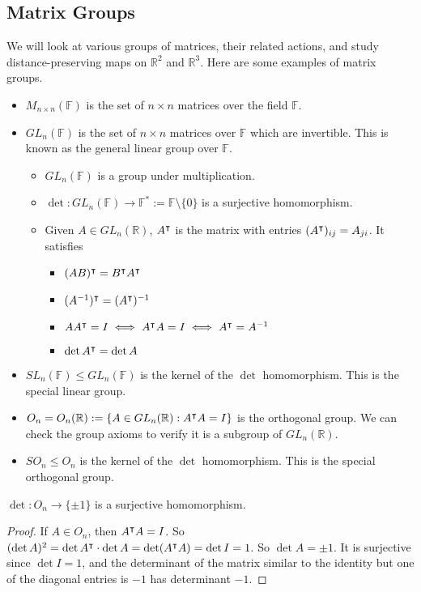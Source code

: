 \subsection{Matrix Groups}
We will look at various groups of matrices, their related actions, and study distance-preserving maps on \(\mathbb R^2\) and \(\mathbb R^3\).
Here are some examples of matrix groups.
\begin{itemize}
	\item \(M_{n \times n}(\mathbb F)\) is the set of \(n \times n\) matrices over the field \(\mathbb F\).
	\item \(GL_n(\mathbb F)\) is the set of \(n \times n\) matrices over \(\mathbb F\) which are invertible.
	      This is known as the general linear group over \(\mathbb F\).
	      \begin{itemize}
		      \item \(GL_n(\mathbb F)\) is a group under multiplication.
		      \item \(\det\colon GL_n(\mathbb F) \to \mathbb F^* := \mathbb F \setminus \{ 0 \}\) is a surjective homomorphism.
		      \item Given \(A \in GL_n(\mathbb R)\), \(A^\intercal\) is the matrix with entries \((A^\intercal)_{ij} = A_{ji}\).
		            It satisfies
		            \begin{itemize}
			            \item \((AB)^\intercal = B^\intercal A^\intercal\)
			            \item \((A^{-1})^\intercal = (A^\intercal)^{-1}\)
			            \item \(AA^\intercal = I \iff A^\intercal A = I \iff A^\intercal = A^{-1}\)
			            \item \(\det A^\intercal = \det A\)
		            \end{itemize}
	      \end{itemize}
	\item \(SL_n(\mathbb F) \leq GL_n(\mathbb F)\) is the kernel of the \(\det\) homomorphism.
	      This is the special linear group.
	\item \(O_n = O_n(\mathbb R) := \{ A \in GL_n(\mathbb R): A^\intercal A = I \}\) is the orthogonal group.
	      We can check the group axioms to verify it is a subgroup of \(GL_n(\mathbb R)\).
	\item \(SO_n \leq O_n\) is the kernel of the \(\det\) homomorphism.
	      This is the special orthogonal group.
\end{itemize}
\begin{proposition}
	\(\det \colon O_n \to \{ \pm 1 \}\) is a surjective homomorphism.
\end{proposition}
\begin{proof}
	If \(A \in O_n\), then \(A^\intercal A = I\).
	So \((\det A)^2 = \det A^\intercal \cdot \det A = \det(A^\intercal A) = \det I = 1\).
	So \(\det A = \pm 1\).
	It is surjective since \(\det I = 1\), and the determinant of the matrix similar to the identity but one of the diagonal entries is \(-1\) has determinant \(-1\).
\end{proof}

